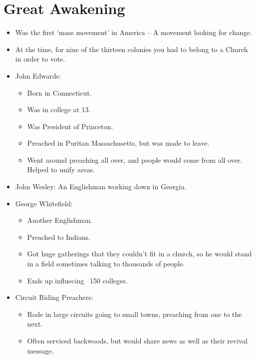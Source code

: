 \documentclass{article}
\begin{document}
  \section{Great Awakening}
  \begin{itemize}
    \item Was the first `mass movement' in America -- A movement looking for change. 
    \item At the time, for nine of the thirteen colonies you had to belong to a Church in order to vote.
    \item John Edwards:
      \begin{itemize}
        \item Born in Connecticut.
        \item Was in college at 13.
        \item Was President of Princeton.
        \item Preached in Puritan Massachusetts, but was made to leave.
        \item Went around preaching all over, and people would come from all over. Helped to unify areas.
      \end{itemize}
    \item John Wesley: An Englishman working down in Georgia.
    \item George Whitefield: 
      \begin{itemize}
        \item Another Englishman.
        \item Preached to Indians.
        \item Got huge gatherings that they couldn't fit in a church, so he would stand in a field sometimes talking to thousands of people.
        \item Ends up influecing ~150 colleges.
      \end{itemize}
    \item Circuit Riding Preachers:
      \begin{itemize}
        \item Rode in large circuits going to small towns, preaching from one to the next.
        \item Often serviced backwoods, but would share news as well as their revival message.
      \end{itemize}
  \end{itemize}
\end{document}
